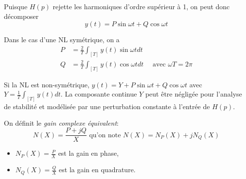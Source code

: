 \documentclass[main.tex]{subfiles}
\begin{document}
Puisque $H(p)$ rejette les harmoniques d'ordre supérieur à 1, on peut donc décomposer \[y(t)=P \sin \omega t + Q \cos \omega t\]

Dans le cas d'une NL symétrique, on a
\begin{align*}
P& =\frac{2}{T} \int_{[T]} y(t) \sin \omega t dt\\
Q& =\frac{2}{T} \int_{[T]} y(t) \cos \omega t dt \quad \text{ avec } \omega T = 2\pi
\end{align*}

\begin{rem}
Si la NL est non-symétrique, $y(t) = Y+P\sin \omega t + Q \cos \omega t$ avec $Y=\frac{1}{T}\int_{[T]} y(t) dt$. La composante continue $Y$ peut être négligée pour l'analyse de stabilité et modélisée par une perturbation constante à l'entrée de $H(p)$.
\end{rem}
\begin{defin}
On définit le \emph{gain complexe équivalent}:
\[ N(X) = \frac{P+jQ}{X} \text{ qu'on note } N(X) = N_P(X) + jN_Q(X) \]
\begin{itemize}
\item $N_P(X)=\frac{P}{X}$ est la gain en phase,
\item $N_Q(X)=\frac{Q}{X}$ est la gain en quadrature.
\end{itemize}
\end{defin}
\end{document}
